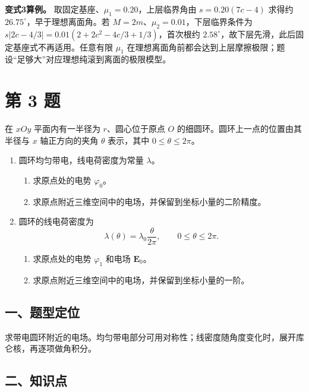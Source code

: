 \documentclass[12pt,a4paper,UTF8]{ctexart}
\newcommand{\tightlist}{\setlength{\itemsep}{0pt}\setlength{\parskip}{0pt}}
\begin{document}
\textbf{变式3算例。} 取固定基座、\(\mu_1=0.20\)，上层临界角由
\(s=0.20(7c-4)\) 求得约 \(26.75^\circ\)，早于理想离面角。若
\(M=2m\)、\(\mu_2=0.01\)，下层临界条件为
\(s|2c-4/3|=0.01(2+2c^2-4c/3+1/3)\)，首次根约
\(2.58^\circ\)，故下层先滑，此后固定基座式不再适用。任意有限 \(\mu_1\)
在理想离面角前都会达到上层摩擦极限；题设``足够大''对应理想纯滚到离面的极限模型。

\newpage

\section{第 3 题}\label{ux7b2c-3-ux9898}

在 \(xOy\) 平面内有一半径为 \(r\)、圆心位于原点 \(O\)
的细圆环。圆环上一点的位置由其半径与 \(x\) 轴正方向的夹角 \(\theta\)
表示，其中 \(0\leq\theta\leq2\pi\)。

\begin{enumerate}
\def\labelenumi{\arabic{enumi}.}
\tightlist
\item
  圆环均匀带电，线电荷密度为常量 \(\lambda\)。

  \begin{enumerate}
  \def\labelenumii{\arabic{enumii}.}
  \tightlist
  \item
    求原点处的电势 \(\varphi_0\)。
  \item
    求原点附近三维空间中的电场，并保留到坐标小量的二阶精度。
  \end{enumerate}
\item
  圆环的线电荷密度为
  \[\lambda(\theta)=\lambda_0\frac{\theta}{2\pi},\qquad 0\leq\theta\leq2\pi.\]

  \begin{enumerate}
  \def\labelenumii{\arabic{enumii}.}
  \tightlist
  \item
    求原点处的电势 \(\varphi_1\) 和电场 \(\boldsymbol E_0\)。
  \item
    求原点附近三维空间中的电场，并保留到坐标小量的一阶。
  \end{enumerate}
\end{enumerate}

\subsection{一、题型定位}\label{ux4e00ux9898ux578bux5b9aux4f4d-2}

求带电圆环附近的电场。均匀带电部分可用对称性；线密度随角度变化时，展开库仑核，再逐项做角积分。

\subsection{二、知识点}\label{ux4e8cux77e5ux8bc6ux70b9-2}
\end{document}
